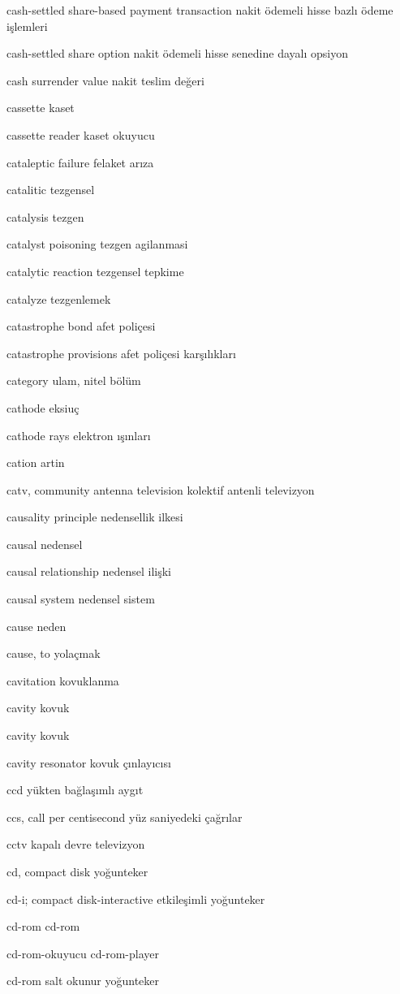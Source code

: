 \documentclass[12pt,fleqn]{article}\usepackage{../../common}
\begin{document}
cash-settled share-based payment transaction nakit ödemeli hisse bazlı ödeme işlemleri

cash-settled share option nakit ödemeli hisse senedine dayalı opsiyon

cash surrender value nakit teslim değeri

cassette kaset

cassette reader kaset okuyucu

cataleptic failure felaket arıza

catalitic tezgensel

catalysis tezgen

catalyst poisoning tezgen agilanmasi

catalytic reaction tezgensel tepkime

catalyze tezgenlemek

catastrophe bond afet poliçesi

catastrophe provisions afet poliçesi karşılıkları

category ulam, nitel bölüm

cathode eksiuç

cathode rays elektron ışınları

cation artin

catv, community antenna television kolektif antenli televizyon

causality principle nedensellik ilkesi

causal nedensel

causal relationship nedensel ilişki

causal system nedensel sistem

cause neden

cause, to yolaçmak

cavitation kovuklanma

cavity kovuk

cavity kovuk

cavity resonator kovuk çınlayıcısı

ccd yükten bağlaşımlı aygıt

ccs, call per centisecond yüz saniyedeki çağrılar

cctv kapalı devre televizyon

cd, compact disk yoğunteker

cd-i; compact disk-interactive etkileşimli yoğunteker

cd-rom cd-rom

cd-rom-okuyucu cd-rom-player

cd-rom salt okunur yoğunteker
\end{document}
